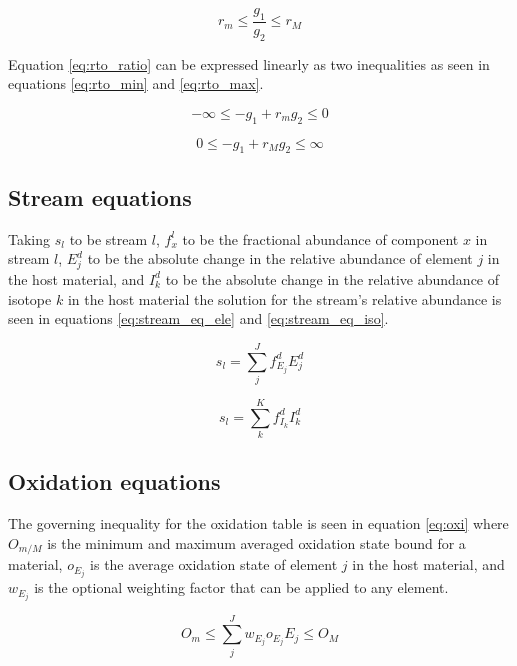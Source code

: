 \documentclass[]{elsarticle}
\begin{document}
\begin{equation}
\label{eq:rto_ratio}
r_{m} \leq \frac{g_{1}}{g_{2}} \leq r_{M} 
\end{equation}

Equation \ref{eq:rto_ratio} can be expressed linearly as two inequalities as
seen in equations \ref{eq:rto_min} and \ref{eq:rto_max}.

\begin{equation}
\label{eq:rto_min}
-\infty \leq -g_{1} + r_{m}g_{2} \leq 0
\end{equation}

\begin{equation}
\label{eq:rto_max}
0 \leq -g_{1} + r_{M}g_{2} \leq \infty
\end{equation}

\subsection{Stream equations} \label{ssec:stream_eq}
Taking $s_{l}$ to be stream $l$, $f_{x}^{l}$ to be the fractional abundance
of component $x$ in stream $l$, $E_{j}^{d}$ to be the absolute change in the 
relative abundance of element $j$ in the host material, and $I_{k}^{d}$ to be 
the absolute change in the relative abundance of isotope $k$ in the host
material the solution for the stream's relative abundance is seen in equations
\ref{eq:stream_eq_ele} and \ref{eq:stream_eq_iso}.

\begin{equation}
\label{eq:stream_eq_ele}
s_{l} = \sum \limits_{j}^{J} f_{E_{j}}^{d} E_{j}^{d}
\end{equation}

\begin{equation}
\label{eq:stream_eq_iso}
s_{l} = \sum \limits_{k}^{K} f_{I_{k}}^{d} I_{k}^{d}
\end{equation}

\subsection{Oxidation equations} \label{ssec:oxid_eq}
The governing inequality for the oxidation table is seen in equation
\ref{eq:oxi} where $O_{m/M}$ is the minimum and maximum averaged oxidation
state bound for a material, $o_{E_{j}}$ is the average oxidation state of
element $j$ in the host material, and $w_{E_{j}}$ is the optional weighting
factor that can be applied to any element. 

\begin{equation}
\label{eq:oxi}
O_{m} \leq \sum \limits_{j}^{J} w_{E_{j}} o_{E_{j}} E_{j} \leq O_{M}
\end{equation}
\end{document}
